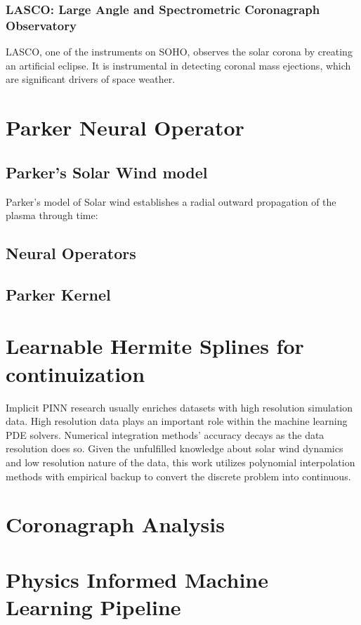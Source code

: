 \documentclass[12pt]{article}
\begin{document}
\subsubsection{LASCO: Large Angle and Spectrometric Coronagraph Observatory}
LASCO, one of the instruments on SOHO, observes the solar corona by creating an artificial eclipse. It is instrumental in detecting coronal mass ejections, which are significant drivers of space weather.


\section{Parker Neural Operator}

\subsection{Parker's Solar Wind model}
Parker's model of Solar wind establishes a radial outward propagation of the plasma through time:

\subsection{Neural Operators}

\subsection{Parker Kernel}

\section{Learnable Hermite Splines for continuization}

Implicit PINN research usually enriches datasets with high resolution simulation data. High resolution data plays an important role within the machine learning PDE solvers. Numerical integration methods' accuracy decays as the data resolution does so.
Given the unfulfilled knowledge about solar wind dynamics and low resolution nature of the data, this work utilizes polynomial interpolation methods with empirical backup \cite{windmodelling1} to convert the discrete problem into continuous.

\section{Coronagraph Analysis}

\section{Physics Informed Machine Learning Pipeline}
\end{document}

